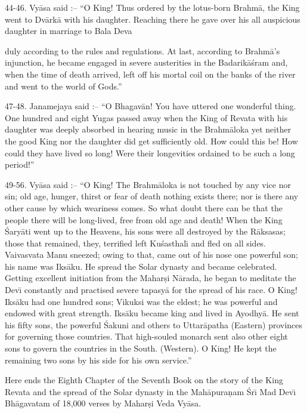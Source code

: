 44-46. Vy\=asa said :-- ``O King! Thus ordered by the lotus-born Brahm\=a, the King went to Dv\=ark\=a with his daughter. Reaching there he gave over his all auspicious daughter in marriage to Bala Deva

duly according to the rules and regulations. At last, according to Brahm\=a's injunction, he became engaged in severe austerities in the Badarik\=a\'sram and, when the time of death arrived, left off his mortal coil on the banks of the river and went to the world of Gods.''

47-48. Janamejaya said :-- ``O Bhagav\=an! You have uttered one wonderful thing. One hundred and eight Yugas passed away when the King of Revata with his daughter was deeply absorbed in hearing music in the Brahm\=aloka yet neither the good King nor the daughter did get sufficiently old. How could this be! How could they have lived so long! Were their longevities ordained to be such a long period!''

49-56. Vy\=asa said :-- ``O King! The Brahm\=aloka is not touched by any vice nor sin; old age, hunger, thirst or fear of death nothing exists there; nor is there any other cause by which weariness comes. So what doubt there can be that the people there will be long-lived, free from old age and death! When the King \'Sary\=ati went up to the Heavens, his sons were all destroyed by the R\=aksasas; those that remained, they, terrified left Ku\'sasthal\={\i} and fled on all sides. Vaivasvata Manu sneezed; owing to that, came out of his nose one powerful son; his name was Iks\=aku. He spread the Solar dynasty and became celebrated. Getting excellent initiation from the Mahar\d{s}i N\=arada, he began to meditate the Dev\={\i} constantly and practised severe tapasy\=a for the spread of his race. O King! Iks\=aku had one hundred sons; Vikuksi was the eldest; he was powerful and endowed with great strength. Iks\=aku became king and lived in Ayodhy\=a. He sent his fifty sons, the powerful \'Sakuni and others to Uttar\=apatha (Eastern) provinces for governing those countries. That high-souled monarch sent also other eight sons to govern the countries in the South. (Western). O King! He kept the remaining two sons by his side for his own service.''

Here ends the Eighth Chapter of the Seventh Book on the story of the King Revata and the spread of the Solar dynasty in the Mah\=apura\d{n}am \'Sr\={\i} Mad Dev\={\i} Bh\=agavatam of 18,000 verses by Mahar\d{s}i Veda Vy\=asa.



